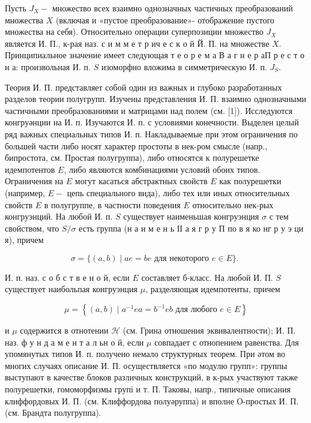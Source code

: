 \documentclass[10pt]{article}
\begin{document}
Пусть $J_{X}-$ множество всех взаимно однозначных частичных преобразований множества $X$ (включая и «пустое преобразование»- отображение пустого множества на себя). Относительно операции суперпозиции множество $J_{X}$ является И. П., к-рая наз. с и м м е т р ич е с к о й Й. П. на множестве $X$. Принципиальное значение имеет следующая т е о р е м а В а г н е р аП р е с т о н а: произвольная И. п. $S$ изоморфно вложима в симметрическую И. п. $J_{S}$.



Теория И. П. представляет собой один из важных и глубоко разработанных разделов теории полугрупп. Изучены представления И. П. взаимно однозначными частичными преобразованиями и матрицами над полем (см. [1]). Исследуются конгруәнции на И. п. Изучаются И. п. с условиями конечности. Выделен целый ряд важных специальных типов И. п. Накладываемые при этом ограничения по большей части либо носят характер простоты в нек-ром смысле (напр., бипростота, см. Простая полугруппа), либо относятся к полурешетке идемпотентов $E$, либо являются комбинациями условий обоих типов. Ограничения на $E$ могут касаться абстрактных свойств $E$ как полурешетки (например, $E-$ цепь специального вида), либо тех или иных относительных свойств $E$ в полугруппе, в частности поведения $E$ относительно нек-рых конгруэнций. На любой И. п. $S$ существует наименьшая конгруэнция $\sigma$ с тем свойством, что $S / \sigma$ есть группа (н а и м е н ь ІІ а я г р у П по в я ко нг р у э ци я), причем



\[

\sigma=\{(a, b) \mid a e=b e \text { для некоторого } e \in E\} \text {. }

\]



И. п. наз. с о б с т в е н о й, если $E$ составляет б-класс. На любой И. П. $S$ существует наибольпая конгруэнция $\mu$, разделяющая идемпотенты, причем



\[

\mu=\left\{(a, b) \mid a^{-1} e a=b^{-1} e b \text { для любого } e \in E\right\}

\]



и $\mu$ содержится в отнотении $\mathscr{H}$ (см. Грина отношения эквивалентности); И. П. наз. ф у н д а м е н т а л ьн о й, если $\mu$ совпадает с отнопением равенства. Для упомянутых типов И. п. получено немало структурных теорем. При әтом во многих случаях описание И. П. осуществляется «по модулю групп»: группы выступают в качестве блоков различных конструкций, в к-рых участвуют также полурешетки, гомоморфизмы групі и т. П. Таковы, напр., типичные описания клиффордовых И. П. (см. Клиффордова полуәруппа) и вполне О-простых И. П. (см. Брандта полугруппа).
\end{document}
